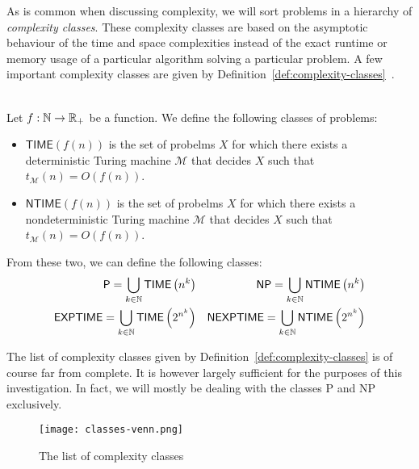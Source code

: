     As is common when discussing complexity, we will sort problems in a hierarchy of \emph{complexity classes}. These complexity classes are based on the asymptotic behaviour of the time and space complexities instead of the exact runtime or memory usage of a particular algorithm solving a particular problem. A few important complexity classes are given by Definition~\ref{def:complexity-classes}~\cite{langages-formels}.

    \begin{definition}\ \\
        \label{def:complexity-classes}
        Let \(f: \mathbb{N} \rightarrow \mathbb{R}_+\) be a function. We define the following classes of problems:
        \begin{itemize}
            \item \(\textsf{TIME}(f(n))\) is the set of probelms \(X\) for which there exists a deterministic Turing machine \(\mathcal{M}\) that decides \(X\) such that \(t_{\mathcal{M}}(n) = O(f(n))\).
            \item 
            \(\textsf{NTIME}(f(n))\) is the set of probelms \(X\) for which there exists a nondeterministic Turing machine \(\mathcal{M}\) that decides \(X\) such that \(t_{\mathcal{M}}(n) = O(f(n))\).    
        \end{itemize}
        From these two, we can define the following classes:
        \begin{align*}
            \textsf{P} = \bigcup\limits_{k\in\mathbb{N}} \textsf{TIME}\left(n^k\right)& &
            \textsf{NP} = \bigcup\limits_{k\in\mathbb{N}} \textsf{NTIME}\left(n^k\right) \\
            \textsf{EXPTIME} = \bigcup\limits_{k\in\mathbb{N}} \textsf{TIME}\left(2^{n^k}\right) & &
            \textsf{NEXPTIME} = \bigcup\limits_{k\in\mathbb{N}} \textsf{NTIME}\left(2^{n^k}\right) \\
        \end{align*}
    \end{definition}

    The list of complexity classes given by Definition~\ref{def:complexity-classes} is of course far from complete. It is however largely sufficient for the purposes of this investigation. In fact, we will mostly be dealing with the classes \textsf{P} and \textsf{NP} exclusively.


    \begin{figure}
        \begin{center}
           \texttt{[image: classes-venn.png]}
        \end{center}
        \caption{The list of complexity classes}
    \end{figure}

